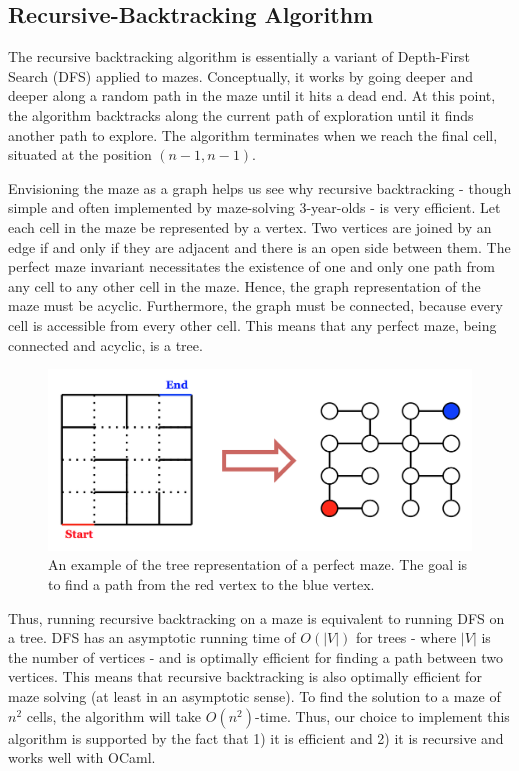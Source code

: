 \documentclass[11pt, margin=1in]{article}
\newcommand{\tab}{\par \qquad}
\newcommand{\card}[1]{\ensuremath{\left\vert#1\right\vert}}
\begin{document}
\subsection{Recursive-Backtracking Algorithm} %
The recursive backtracking algorithm is essentially a variant of Depth-First Search (DFS) applied to mazes.  Conceptually, it works by going deeper and deeper along a random path in the maze until it hits a dead end.  At this point, the algorithm backtracks along the current path of exploration until it finds another path to explore.  The algorithm terminates when we reach the final cell, situated at the position $(n - 1, n - 1)$. 

\tab Envisioning the maze as a graph helps us see why recursive backtracking - though simple and often implemented by maze-solving 3-year-olds - is very efficient.  Let each cell in the maze be represented by a vertex.  Two vertices are joined by an edge if and only if they are adjacent and there is an open side between them.  The perfect maze invariant necessitates the existence of one and only one path from any cell to any other cell in the maze.  Hence, the graph representation of the maze must be acyclic.  Furthermore, the graph must be connected, because every cell is accessible from every other cell.  This means that any perfect maze, being connected and acyclic, is a tree.                  

\begin{figure}[H]
\begin{center}
\includegraphics[scale=0.7]{tree.jpg}
\caption{An example of the tree representation of a perfect maze.  The goal is to find a path from the red vertex to the blue vertex.}
\end{center}
\end{figure}

Thus, running recursive backtracking on a maze is equivalent to running DFS on a tree.  DFS has an asymptotic running time of $O(\card{V})$ for trees - where $\card{V}$ is the number of vertices - and is optimally efficient for finding a path between two vertices.  This means that recursive backtracking is also optimally efficient for maze solving (at least in an asymptotic sense).  To find the solution to a maze of $n^2$ cells, the algorithm will take $O(n^2)$-time.  Thus, our choice to implement this algorithm is supported by the fact that 1) it is efficient and 2) it is recursive and works well with OCaml.      
\end{document}
